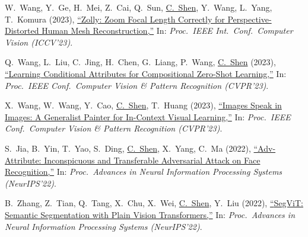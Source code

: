 \documentclass[9pt, a4paper]{article}
\newcommand{\years}[1]{\marginnote{\scriptsize #1}}
\def\highlight{\uline}
\begin{document}
\medskip

\years{2023} W.~Wang, Y.~Ge, H.~Mei, Z.~Cai, Q.~Sun, \highlight{C.~Shen}, Y.~Wang, L.~Yang, T.~Komura (2023),
\href{http://www.google.com/search?lr=&ie=UTF-8&oe=UTF-8&q=Zolly%3A+Zoom+Focal+Length+Correctly+for+Perspective-Distorted+Human+Mesh+Reconstruction+Wenjia+Wang%2C+Yongtao+Ge%2C+Haiyi+Mei%2C+Zhongang+Cai%2C+Qingping+Sun%2C+Chunhua+Shen%2C+Yanjun+Wang%2C+Lei+Yang%2C+Taku+Komura}{``Zolly: Zoom Focal Length Correctly for Perspective-Distorted Human Mesh Reconstruction,{}''}
In: \emph{Proc.\ IEEE Int.\ Conf.\  Computer Vision (ICCV'23)}.

\medskip

\years{2023} Q.~Wang, L.~Liu, C.~Jing, H.~Chen, G.~Liang, P.~Wang, \highlight{C.~Shen} (2023),
\href{http://www.google.com/search?lr=&ie=UTF-8&oe=UTF-8&q=Learning+Conditional+Attributes+for+Compositional+Zero-Shot+Learning+Qingsheng+Wang%2C+Lingqiao+Liu%2C+Chenchen+Jing%2C+Hao+Chen%2C+Guoqiang+Liang%2C+Peng+Wang%2C+Chunhua+Shen}{``Learning Conditional Attributes for Compositional Zero-Shot Learning,{}''}
In: \emph{Proc.\ IEEE Conf.\  Computer Vision \& Pattern Recognition (CVPR'23)}.

\medskip

\years{2023} X.~Wang, W.~Wang, Y.~Cao, \highlight{C.~Shen}, T.~Huang (2023),
\href{http://www.google.com/search?lr=&ie=UTF-8&oe=UTF-8&q=Images+Speak+in+Images%3A+A+Generalist+Painter+for+In-Context+Visual+Learning+Xinlong+Wang%2C+Wen+Wang%2C+Yue+Cao%2C+Chunhua+Shen%2C+Tiejun+Huang}{``Images Speak in Images: A Generalist Painter for In-Context Visual Learning,{}''}
In: \emph{Proc.\ IEEE Conf.\  Computer Vision \& Pattern Recognition (CVPR'23)}.

\medskip

\years{2022} S.~Jia, B.~Yin, T.~Yao, S.~Ding, \highlight{C.~Shen}, X.~Yang, C.~Ma (2022),
\href{http://www.google.com/search?lr=&ie=UTF-8&oe=UTF-8&q=Adv-Attribute%3A+Inconspicuous+and+Transferable+Adversarial+Attack+on+Face+Recognition+Shuai+Jia%2C+Bangjie+Yin%2C+Taiping+Yao%2C+Shouhong+Ding%2C+Chunhua+Shen%2C+Xiaokang+Yang%2C+Chao+Ma}{``Adv-Attribute: Inconspicuous and Transferable Adversarial Attack on Face Recognition,{}''}
In: \emph{Proc.\ Advances in Neural Information Processing Systems (NeurIPS'22)}.

\medskip

\years{2022} B.~Zhang, Z.~Tian, Q.~Tang, X.~Chu, X.~Wei, \highlight{C.~Shen}, Y.~Liu (2022),
\href{http://www.google.com/search?lr=&ie=UTF-8&oe=UTF-8&q=SegViT%3A+Semantic+Segmentation+with+Plain+Vision+Transformers+Bowen+Zhang%2C+Zhi+Tian%2C+Quan+Tang%2C+Xiangxiang+Chu%2C+Xiaolin+Wei%2C+Chunhua+Shen%2C+Yifan+Liu}{``{SegViT}: Semantic Segmentation with Plain Vision Transformers,{}''}
In: \emph{Proc.\ Advances in Neural Information Processing Systems (NeurIPS'22)}.
\end{document}

